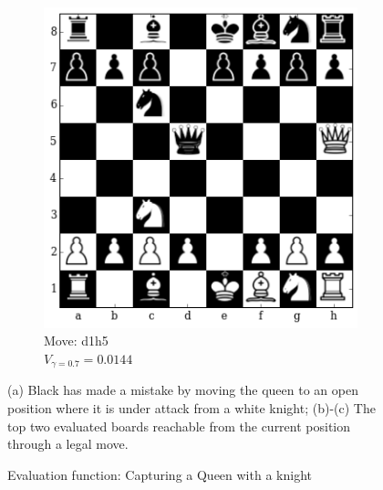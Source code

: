 \begin{figure}[H]
\begin{subfigure}[t]{0.45\textwidth}
    \includegraphics[width=\textwidth]{img/table_evaluations/output_11_4.png}
        \caption{Move: d1h5\\
        $V_{\gamma=0.7}=0.0144$}
    \end{subfigure}
    \caption{Evaluation function: Capturing a Queen with a knight}
    \small
    \justifying
(a) Black has made a mistake by moving the queen to an open position where 
it is under attack from a white knight; (b)-(c) The top two evaluated boards 
reachable from the current position through a legal move.
\label{figure:eval:queen-capture}
\end{figure}

